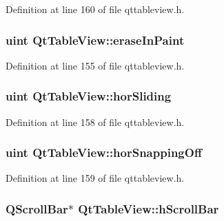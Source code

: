 Definition at line 160 of file qttableview.\+h.

\hypertarget{classQtTableView_aa23f1d1770666cfba4c9dcc3496d4030}{
\subsubsection[{erase\+In\+Paint}]{\setlength{\rightskip}{0pt plus 5cm}uint Qt\+Table\+View\+::erase\+In\+Paint\hspace{0.3cm}{\ttfamily [private]}}}\label{classQtTableView_aa23f1d1770666cfba4c9dcc3496d4030}


Definition at line 155 of file qttableview.\+h.

\hypertarget{classQtTableView_a68c9bdbacec38782c4a05ef264e8cbed}{
\subsubsection[{hor\+Sliding}]{\setlength{\rightskip}{0pt plus 5cm}uint Qt\+Table\+View\+::hor\+Sliding\hspace{0.3cm}{\ttfamily [private]}}}\label{classQtTableView_a68c9bdbacec38782c4a05ef264e8cbed}


Definition at line 158 of file qttableview.\+h.

\hypertarget{classQtTableView_a53b952eecaad103da16c21d5256120a2}{
\subsubsection[{hor\+Snapping\+Off}]{\setlength{\rightskip}{0pt plus 5cm}uint Qt\+Table\+View\+::hor\+Snapping\+Off\hspace{0.3cm}{\ttfamily [private]}}}\label{classQtTableView_a53b952eecaad103da16c21d5256120a2}


Definition at line 159 of file qttableview.\+h.

\hypertarget{classQtTableView_a58b310a612ffd146819027f7e2446f91}{
\subsubsection[{h\+Scroll\+Bar}]{\setlength{\rightskip}{0pt plus 5cm}Q\+Scroll\+Bar$\ast$ Qt\+Table\+View\+::h\+Scroll\+Bar\hspace{0.3cm}{\ttfamily [private]}}}\label{classQtTableView_a58b310a612ffd146819027f7e2446f91}


